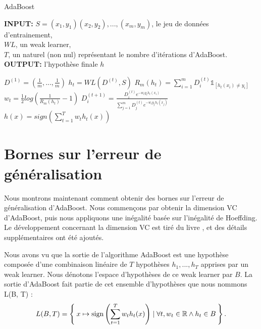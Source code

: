 \documentclass[12pt]{article}
\newcommand{\R}{\mathbb{R}}
\begin{document}
	
	\begin{algorithm}[H]
		\caption{AdaBoost}
		\label{adaboost:algo}
		\begin{flushleft}
			\textbf{INPUT:} $S=(x_1,y_1)(x_2,y_2),...,(x_m,y_m)$, le jeu de données d'entrainement,\\
			\hspace{1.5cm} $WL$, un weak learner,\\
			\hspace{1.5cm} $T$, un naturel (non nul) représentant le nombre d'itérations d'AdaBoost.\\
			\textbf{OUTPUT:} l'hypothèse finale $h$
		\end{flushleft}
		\begin{algorithmic}[1]
			\State $D^{(1)}=(\frac{1}{m},...,\frac{1}{m})$
			\State $h_t = WL(D^{(t)},S)$
			\State $R_m(h_t)= \sum_{i=1}^m D^{(t)}_i \mathbb{1}_{[h_t(x_i) \neq y_i]}$
			\State $w_t = \frac{1}{2} log(\frac{1}{R_m(h_t)} - 1)$
			\State $D^{(t+1)}_i = \frac{D^{(t)}_i e^{-w_t y_i h_t(x_i)}}{\sum_{j=1}^m D^{(t)}_j e^{-w_t y_j h_t(x_j)}}$ 
			\EndFor
			\EndFor
			\State $h(x) = sign (\sum_{t=1}^T w_t h_t(x))$
			\State {}
			\EndFunction
		\end{algorithmic}
	\end{algorithm}
	
	\section{Bornes sur l’erreur de généralisation}
	
	Nous montrons maintenant comment obtenir des bornes sur l'erreur de généralisation d'AdaBoost.
	Nous commençons par obtenir la dimension VC d'AdaBoost, puis nous appliquons une inégalité basée sur l'inégalité de Hoeffding.
	Le développement concernant la dimension VC est tiré du livre \cite{Shalev-Shwartz2014-ba}, et des détails supplémentaires ont été ajoutés.
	
	Nous avons vu que la sortie de l'algorithme AdaBoost est une hypothèse composée d'une combinaison linéaire de $T$ hypothèses $h_1, ..., h_T$ apprises par un weak learner.
	Nous dénotons l'espace d'hypothèses de ce weak learner par $B$.
	La sortie d'AdaBoost fait partie de cet ensemble d'hypothèses que nous nommons L(B, T) :
	\[
	L(B, T) = \Set{ x \mapsto \text{sign}\left( \sum_{t=1}^T w_t h_t(x) \right) \mid \forall t, w_t \in \R \land h_t \in B}.
	\]
	
\end{document}
